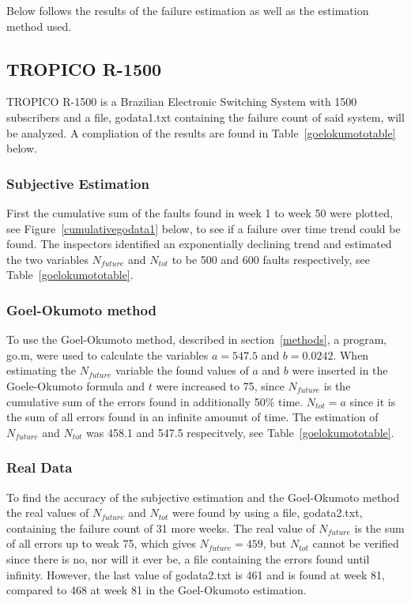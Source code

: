 Below follows the results of the failure estimation as well as the estimation method used.

\subsection{TROPICO R-1500}
TROPICO R-1500 is a Brazilian Electronic Switching System with 1500 subscribers and a file, godata1.txt containing the failure count of said system, will be analyzed. A compliation of the results are found in Table~\ref{goelokumototable} below.
\subsubsection*{Subjective Estimation} 
First the cumulative sum of the faults found in week 1 to week 50 were plotted, see Figure~\ref{cumulativegodata1} below, to see if a failure over time trend could be found.
The inspectors identified an exponentially declining trend and estimated the two variables $N_{future}$ and $N_{tot}$ to be 500 and 600 faults respectively, see Table~\ref{goelokumototable}. 
\subsubsection*{Goel-Okumoto method}
To use the Goel-Okumoto method, described in section~\ref{methods}, a program, go.m, were used to calculate the variables $a=547.5$ and $b=0.0242$.
When estimating the $N_{future}$ variable the found values of $a$ and $b$ were inserted in the Goele-Okumoto formula and $t$ were increased to 75, since $N_{future}$ is the cumulative sum of the errors found in additionally 50\% time. 
$N_{tot} = a$ since it is the sum of all errors found in an infinite amounut of time.
The estimation of $N_{future}$ and $N_{tot}$ was 458.1 and 547.5 respecitvely, see Table~\ref{goelokumototable}.
\subsubsection*{Real Data}
To find the accuracy of the subjective estimation and the Goel-Okumoto method the real values of $N_{future}$ and $N_{tot}$ were found by using a file, godata2.txt, containing the failure count of 31 more weeks. 
The real value of $N_{future}$ is the sum of all errors up to weak 75, which gives $N_{future}=459$, but $N_{tot}$ cannot be verified since there is no, nor will it ever be, a file containing the errors found until infinity. However, the last value of godata2.txt is 461 and is found at week 81, compared to 468 at week 81 in the Goel-Okumoto estimation.

